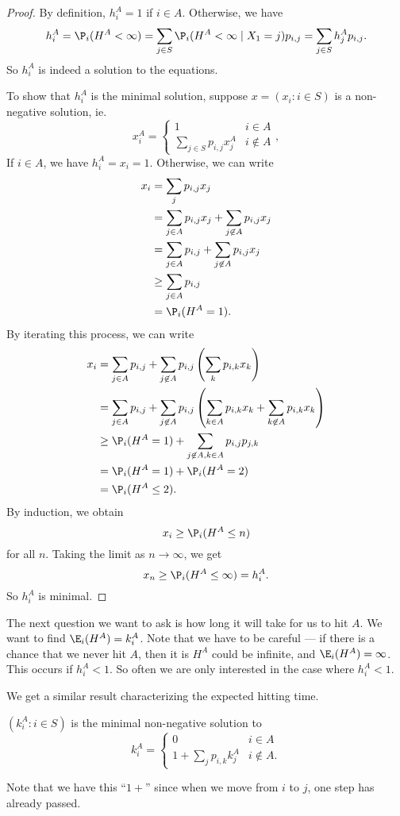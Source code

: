 \documentclass[a4paper]{article}
\begin{document}
\begin{proof}
  By definition, $h_i^A = 1$ if $i \in A$. Otherwise, we have
  \[
    h_i^A = \P_i(H^A < \infty) = \sum_{j\in S} \P_i(H^A < \infty \mid X_1 = j)p_{i, j} = \sum_{j\in S}h_{j}^A p_{i, j}.
  \]
  So $h_i^A$ is indeed a solution to the equations.

  To show that $h_i^A$ is the minimal solution, suppose $x = (x_i: i \in S)$ is a non-negative solution, ie.
  \[
    x_i^A =
    \begin{cases}
      1 & i \in A\\
      \sum_{j \in S}p_{i, j}x_j^A & i \not \in A
    \end{cases},
  \]
  If $i \in A$, we have $h_i^A = x_i = 1$. Otherwise, we can write
  \begin{align*}
    x_i &= \sum_j p_{i, j}x_j \\
    &= \sum_{j \in A}p_{i, j}x_j + \sum_{j \not\in A}p_{i, j}x_j \\
    &= \sum_{j \in A}p_{i, j} + \sum_{j \not\in A}p_{i, j}x_j \\
    &\geq \sum_{j \in A}p_{i, j}\\
    &= \P_i(H^A = 1).
  \end{align*}
  By iterating this process, we can write
  \begin{align*}
    x_i &= \sum_{j \in A} p_{i, j} + \sum_{j \not\in A} p_{i, j}\left(\sum_k p_{i, k} x_k\right) \\
    &= \sum_{j \in A} p_{i, j} + \sum_{j \not\in A} p_{i, j}\left(\sum_{k\in A} p_{i, k} x_k + \sum_{k \not\in A} p_{i, k}x_k\right)\\
    &\geq \P_i (H^A = 1) + \sum_{j \not \in A, k \in A}p_{i, j}p_{j, k}\\
    &= \P_i(H^A = 1) + \P_i(H^A = 2)\\
    &= \P_i (H^A \leq 2).
  \end{align*}
  By induction, we obtain
  \[
    x_i \geq \P_i(H^A \leq n)
  \]
  for all $n$. Taking the limit as $n \to \infty$, we get
  \[
    x_n \geq \P_i(H^A \leq \infty) = h_i^A.
  \]
  So $h_i^A$ is minimal.
\end{proof}
The next question we want to ask is how long it will take for us to hit $A$. We want to find $\E_i(H^A) = k_i^A$. Note that we have to be careful --- if there is a chance that we never hit $A$, then it is $H^A$ could be infinite, and $\E_i(H^A) = \infty$. This occurs if $h_i^A < 1$. So often we are only interested in the case where $h_i^A < 1$.

We get a similar result characterizing the expected hitting time.
\begin{thm}
  $(k_i^A: i \in S)$ is the minimal non-negative solution to
  \[
    k_i^A =
    \begin{cases}
      0 & i \in A\\
      1 + \sum_j p_{i, k}k_j^A & i \not\in A.
    \end{cases}
  \]
\end{thm}
Note that we have this ``$1 +$'' since when we move from $i$ to $j$, one step has already passed.
\end{document}
